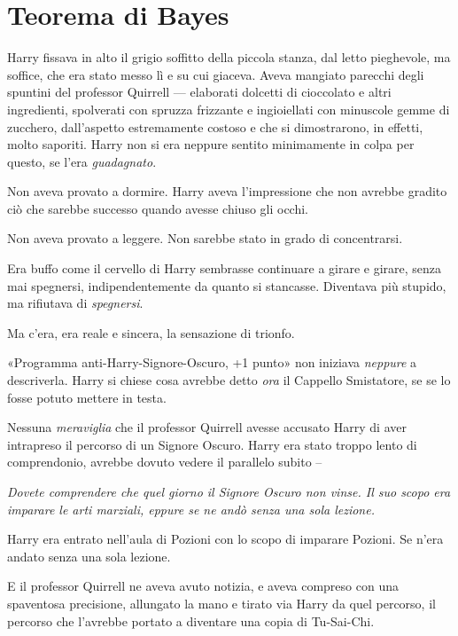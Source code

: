 
\chapter{Teorema di Bayes}
\label{capitolo:20}

Harry fissava in alto il grigio soffitto della piccola stanza, dal letto pieghevole, ma soffice, che era stato messo lì e su cui giaceva. Aveva mangiato parecchi degli spuntini del professor Quirrell — elaborati dolcetti di cioccolato e altri ingredienti, spolverati con spruzza frizzante e ingioiellati con minuscole gemme di zucchero, dall’aspetto estremamente costoso e che si dimostrarono, in effetti, molto saporiti. Harry non si era neppure sentito minimamente in colpa per questo, se l’era \textit{guadagnato}.



Non aveva provato a dormire. Harry aveva l’impressione che non avrebbe gradito ciò che sarebbe successo quando avesse chiuso gli occhi.

Non aveva provato a leggere. Non sarebbe stato in grado di concentrarsi.

Era buffo come il cervello di Harry sembrasse continuare a girare e girare, senza mai spegnersi, indipendentemente da quanto si stancasse. Diventava più stupido, ma rifiutava di \textit{spegnersi}.

Ma c’era, era reale e sincera, la sensazione di trionfo.

«Programma anti-Harry-Signore-Oscuro, +1 punto» non iniziava \textit{neppure} a descriverla. Harry si chiese cosa avrebbe detto \textit{ora} il Cappello Smistatore, se se lo fosse potuto mettere in testa.

Nessuna \textit{meraviglia} che il professor Quirrell avesse accusato Harry di aver intrapreso il percorso di un Signore Oscuro. Harry era stato troppo lento di comprendonio, avrebbe dovuto vedere il parallelo subito –

\textit{Dovete comprendere che quel giorno il Signore Oscuro non vinse. Il suo scopo era imparare le arti marziali, eppure se ne andò senza una sola lezione.}

Harry era entrato nell’aula di Pozioni con lo scopo di imparare Pozioni. Se n’era andato senza una sola lezione.

E il professor Quirrell ne aveva avuto notizia, e aveva compreso con una spaventosa precisione, allungato la mano e tirato via Harry da quel percorso, il percorso che l’avrebbe portato a diventare una copia di Tu-Sai-Chi.

